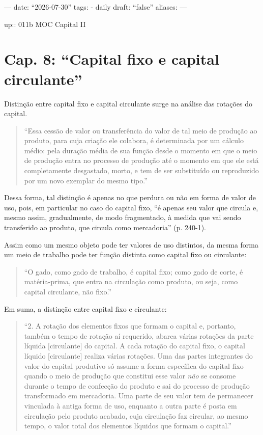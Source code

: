 ---
date: ``2026-07-30''
tags:
  - daily
draft: ``false''
aliases:
---

up:: 011b MOC Capital II

\section{Cap. 8: ``Capital fixo e capital circulante''}
Distinção entre capital fixo e capital circulante surge na análise das rotações do capital. 
\begin{quote}
``Essa cessão de valor ou transferência do valor de tal meio de produção ao produto, para cuja criação ele colabora, é determinada por um cálculo médio: pela duração média de sua função desde o momento em que o meio de produção entra no processo de produção até o momento em que ele está completamente desgastado, morto, e tem de ser substituído ou reproduzido por um novo exemplar do mesmo tipo.'' \parencite[p. 239-40]{Marx2014}
\end{quote}

Dessa forma, tal distinção é apenas no que perdura ou não em forma de valor de uso, pois, em particular no caso do capital fixo, ``é apenas seu valor que circula e, mesmo assim, gradualmente, de modo fragmentado, à medida que vai sendo transferido ao produto, que circula como mercadoria'' (p. 240-1).

Assim como um mesmo objeto pode ter valores de uso distintos, da mesma forma um meio de trabalho pode ter função distinta como capital fixo ou circulante:
\begin{quote}
``O gado, como gado de trabalho, é capital fixo; como gado de corte, é matéria-prima, que entra na circulação como produto, ou seja, como capital circulante, não fixo.'' \parencite[p. 244]{Marx2014}
\end{quote}

Em suma, a distinção entre capital fixo e circulante:
\begin{quote}
``2. A rotação dos elementos fixos que formam o capital e, portanto, também o tempo de rotação aí requerido, abarca várias rotações da parte líquida [circulante] do capital. A cada rotação do capital fixo, o capital líquido [circulante] realiza várias rotações. Uma das partes integrantes do valor do capital produtivo só assume a forma específica do capital fixo quando o meio de produção que constitui esse valor \textit{não} se consome durante o tempo de confecção do produto e sai do processo de produção transformado em mercadoria. Uma parte de seu valor tem de permanecer vinculada à antiga forma de uso, enquanto a outra parte é posta em circulação pelo produto acabado, cuja circulação faz circular, ao mesmo tempo, o valor total dos elementos líquidos que formam o capital.'' \parencite[p. 249, grifo meu]{Marx2014}
\end{quote}

